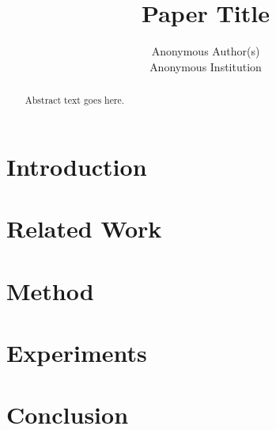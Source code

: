 \documentclass[11pt]{article}
\title{Paper Title}
\author{Anonymous Author(s) \\ Anonymous Institution}
\date{}
\begin{document}
\maketitle

\begin{abstract}
Abstract text goes here.
\end{abstract}

\section{Introduction}

\section{Related Work}

\section{Method}

\section{Experiments}

\section{Conclusion}



\end{document}
